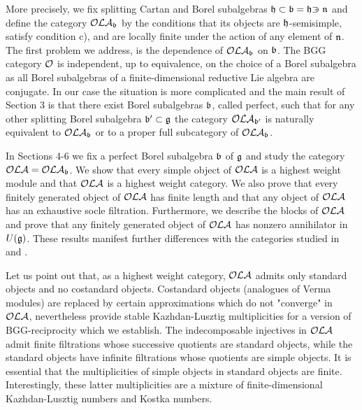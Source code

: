 \documentclass[12pt]{amsart}
\makeatletter
\def\mathfrak{\frak}
\def\mathcal{\cal}
\def\@putname#1#2#3#4{\def\@@ref{#3}\let\old@bf\bf
        \def\bf##1{\old@bf\if?\noexpand##1?{#4}\else##1\fi}%
        #1{#2}%
        \let\bf\old@bf}
\def\@putname#1#2#3#4{\def\@@ref{#3}\let\old@bf\bf    %
        \let\old@reset@font\reset@font                  %
        \def\bf##1{\old@bf\if?\noexpand##1?{#4}\else##1\fi}%
        \def\reset@font##1##2{\old@reset@font##1\if?\noexpand##2?{#4}\else##2\fi}#1{#2}%
        \let\bf\old@bf\let\reset@font\old@reset@font}
\let\my@cite=\cite
\def\cite#1{\@putname\my@cite{#1}{\@citeb}{\tiny\rm\@@ref}}
\theoremstyle{plain} %
\numberwithin{equation}{section}
\theoremstyle{definition}
\theoremstyle{remark}
\theoremstyle{plain} %
\newcommand{\fg}{\mathfrak{g}}
\def\crplus{\hbox{$\supset${\raise1.15pt\hbox{\kern -0.55em ${\scriptscriptstyle +}$}}\ }}
\makeatother
\begin{document}
More precisely, we fix splitting Cartan and Borel subalgebras $\mathfrak{h}\subset \mathfrak{b}=\mathfrak{h}{\crplus} \mathfrak{n}$ and define the category $\mathcal{OLA}_{\mathfrak{b}}$  by the conditions that its objects are $\mathfrak{h}$-semisimple, satisfy condition c), and are locally finite under the action of any element of $\mathfrak{n}$. The first problem we address, is the dependence  of $\mathcal{OLA}_{\mathfrak{b}}$ on $\mathfrak{b}$. The BGG category $\mathcal{O}$ is independent, up to equivalence, on the choice of a Borel subalgebra as all Borel subalgebras of a finite-dimensional reductive Lie algebra are conjugate. In our case the situation is more complicated and the main result of Section 3 is that there exist Borel subalgebras $\mathfrak{b}$, called perfect, such that for any other splitting Borel subalgebra $\mathfrak{b}'\subset\fg$ the category  $\mathcal{OLA}_{\mathfrak{b}'}$ is naturally equivalent to  $\mathcal{OLA}_{\mathfrak{b}}$ or to a proper full subcategory of  $\mathcal{OLA}_{\mathfrak{b}}$.

In Sections 4-6 we fix a perfect Borel subalgebra $\mathfrak{b}$ of $\fg$ and study  the category  $\mathcal{OLA}=\mathcal{OLA}_{\mathfrak{b}}$. We show that every simple object of  $\mathcal{OLA}$ is a highest weight module and that  $\mathcal{OLA}$ is a highest weight category.  We also prove that every finitely generated object of $\mathcal{OLA}$  has finite length and that any object of  $\mathcal{OLA}$ has an exhaustive socle filtration. Furthermore, we describe the blocks of $\mathcal{OLA}$ and prove that any finitely generated object of $\mathcal{OLA}$ has nonzero annihilator in $U(\mathfrak{g})$. These results manifest further differences with the categories studied in \cite{Nam} and \cite{CP}.


Let us point out that, as a highest weight category, $\mathcal{OLA}$ admits only standard objects and no costandard objects. Costandard objects (analogues of Verma modules) are replaced by certain approximations which do not  "converge" in $\mathcal{OLA}$, nevertheless provide stable Kazhdan-Lusztig multiplicities for a version of BGG-reciprocity which we establish. The indecomposable injectives in  $\mathcal{OLA}$ admit finite filtrations whose successive  quotients are standard objects, while the standard objects have infinite filtrations whose quotients are simple objects. It is essential that the multiplicities of simple objects in standard objects are  finite. 
Interestingly, these latter multiplicities are  a mixture of finite-dimensional Kazhdan-Lusztig numbers and Kostka numbers.
\end{document}
